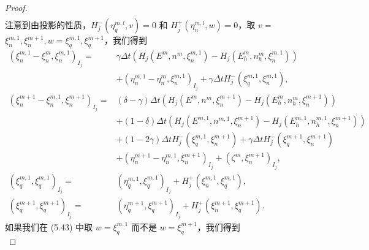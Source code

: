 \begin{proof}
\begin{align*}
    \end{align*}
    注意到由投影的性质，$H_{j}^{-}\left(\eta_{q}^{m, l}, v\right)=0$ 和 $H_{j}^{+}\left(\eta_{n}^{m, l}, w\right)=0$，取 $v=$ $\xi_{n}^{m, 1}, \xi_{n}^{m+1}, w=\xi_{q}^{m, 1}, \xi_{q}^{m+1}$，我们得到
    \begin{align}
        \left(\xi_{n}^{m, 1}-\xi_{n}^{m}, \xi_{n}^{m, 1}\right)_{I_{j}}=  & \gamma \Delta t\left(H_{j}\left(E^{m}, n^{m}, \xi_{n}^{m, 1}\right)-H_{j}\left(E_{h}^{m}, n_{h}^{m}, \xi_{n}^{m, 1}\right)\right) \nonumber                \\
                                                                          & +\left(\eta_{n}^{m, 1}-\eta_{n}^{m}, \xi_{n}^{m, 1}\right)_{I_{j}}+\gamma \Delta t H_{j}^{-}\left(\xi_{q}^{m, 1}, \xi_{n}^{m, 1}\right),                   \\
        \left(\xi_{n}^{m+1}-\xi_{n}^{m, 1}, \xi_{n}^{m+1}\right)_{I_{j}}= & (\delta-\gamma) \Delta t\left(H_{j}\left(E^{m}, n^{m}, \xi_{n}^{m+1}\right)-H_{j}\left(E_{h}^{m}, n_{h}^{m}, \xi_{n}^{m+1}\right)\right)\nonumber          \\
                                                                          & +(1-\delta) \Delta t\left(H_{j}\left(E^{m, 1}, n^{m, 1}, \xi_{n}^{m+1}\right)-H_{j}\left(E_{h}^{m, 1}, n_{h}^{m, 1}, \xi_{n}^{m+1}\right)\right) \nonumber \\
                                                                          & +(1-2 \gamma) \Delta t H_{j}^{-}\left(\xi_{q}^{m, 1}, \xi_{n}^{m+1}\right)+\gamma \Delta t H_{j}^{-}\left(\xi_{q}^{m+1}, \xi_{n}^{m+1}\right) \nonumber    \\
                                                                          & +\left(\eta_{n}^{m+1}-\eta_{n}^{m, 1}, \xi_{n}^{m+1}\right)_{I_{j}}+\left(\zeta^{m}, \xi_{n}^{m+1}\right)_{I_{j}},                                         \\
        \left(\xi_{q}^{m, 1}, \xi_{q}^{m, 1}\right)_{I_{j}}=              & \left(\eta_{q}^{m, 1}, \xi_{q}^{m, 1}\right)_{I_{j}}+H_{j}^{+}\left(\xi_{n}^{m, 1}, \xi_{q}^{m, 1}\right),                                                 \\
        \left(\xi_{q}^{m+1}, \xi_{q}^{m+1}\right)_{I_{j}}=                & \left(\eta_{q}^{m+1}, \xi_{q}^{m+1}\right)_{I_{j}}+H_{j}^{+}\left(\xi_{n}^{m+1}, \xi_{q}^{m+1}\right) .
    \end{align}
    如果我们在 (5.43) 中取 $w=\xi_{q}^{m, 1}$ 而不是 $w=\xi_{q}^{m+1}$，我们得到
    \begin{equation}

\end{equation}
\end{proof}
